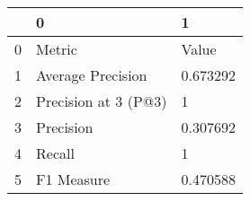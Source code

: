 \begin{tabular}{lll}
\toprule
{} &                     0 &         1 \\
\midrule
0 &                Metric &     Value \\
1 &     Average Precision &  0.673292 \\
2 &  Precision at 3 (P@3) &         1 \\
3 &             Precision &  0.307692 \\
4 &                Recall &         1 \\
5 &            F1 Measure &  0.470588 \\
\bottomrule
\end{tabular}
